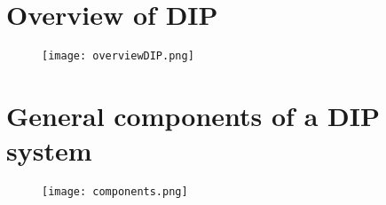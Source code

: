 
\section{Overview of DIP}


\begin{frame}
\begin{figure}
\texttt{[image: overviewDIP.png]}
\end{figure}
\end{frame}


\section{General components of a DIP system}


\begin{frame}
\begin{figure}
\texttt{[image: components.png]}
\end{figure}
\end{frame}



